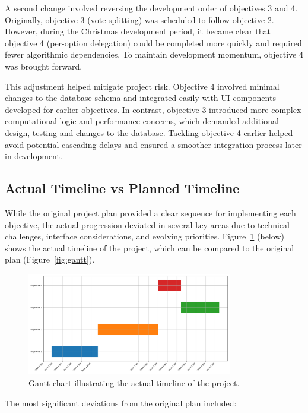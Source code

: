 A second change involved reversing the development order of objectives 3 and 4. Originally, objective 3 (vote splitting) was scheduled to follow objective 2. However, during the Christmas development period, it became clear that objective 4 (per-option delegation) could be completed more quickly and required fewer algorithmic dependencies. To maintain development momentum, objective 4 was brought forward.

This adjustment helped mitigate project risk. Objective 4 involved minimal changes to the database schema and integrated easily with UI components developed for earlier objectives. In contrast, objective 3 introduced more complex computational logic and performance concerns, which demanded additional design, testing and changes to the database. Tackling objective 4 earlier helped avoid potential cascading delays and ensured a smoother integration process later in development.

\subsection{Actual Timeline vs Planned Timeline}
While the original project plan provided a clear sequence for implementing each objective, the actual progression deviated in several key areas due to technical challenges, interface considerations, and evolving priorities. Figure~\ref{fig:actual_gantt} (below) shows the actual timeline of the project, which can be compared to the original plan (Figure~\ref{fig:gantt}).
\begin{figure}[H]
    \centering
    \includegraphics[width=0.8\textwidth]{../common/actual_gantt.png}
    \caption{Gantt chart illustrating the actual timeline of the project.}
    \label{fig:actual_gantt}
\end{figure}

The most significant deviations from the original plan included:

